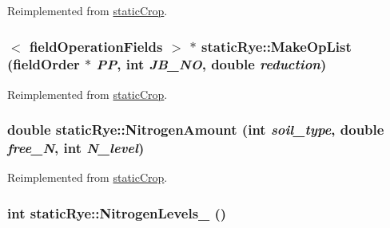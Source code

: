 Reimplemented from \hyperlink{classstatic_crop_afe0cb8a7831afa941a37338f05227d67}{staticCrop}.\hypertarget{classstatic_rye_a0532c6cd87e39116de39436d5b47c7e8}{
\subsubsection[{MakeOpList}]{$<$ {\bf fieldOperationFields} $>$ $\ast$ staticRye::MakeOpList ({\bf fieldOrder} $\ast$ {\em PP}, \/  int {\em JB\_\-NO}, \/  double {\em reduction})}}
\label{classstatic_rye_a0532c6cd87e39116de39436d5b47c7e8}


Reimplemented from \hyperlink{classstatic_crop_a9b67ef1ae531a3afb32b63a4aeb5916b}{staticCrop}.\hypertarget{classstatic_rye_aec49ed18f9cc96318e71ca20d9caaddf}{
\subsubsection[{NitrogenAmount}]{\setlength{\rightskip}{0pt plus 5cm}double staticRye::NitrogenAmount (int {\em soil\_\-type}, \/  double {\em free\_\-N}, \/  int {\em N\_\-level})}}
\label{classstatic_rye_aec49ed18f9cc96318e71ca20d9caaddf}


Reimplemented from \hyperlink{classstatic_crop_af3aa85321a8a75406f8a0751b71587d0}{staticCrop}.\hypertarget{classstatic_rye_a22cb837905cefab1cb8491b216a4eaa7}{
\subsubsection[{NitrogenLevels\_\-}]{\setlength{\rightskip}{0pt plus 5cm}int staticRye::NitrogenLevels\_\- ()}}
\label{classstatic_rye_a22cb837905cefab1cb8491b216a4eaa7}


